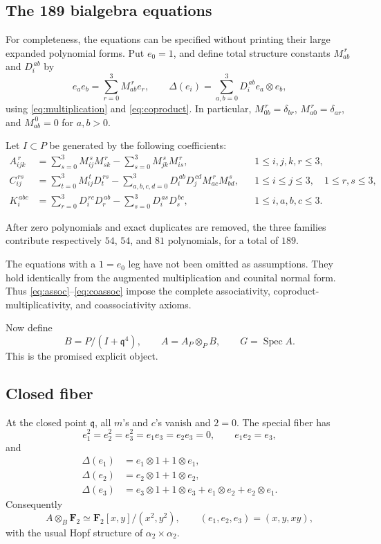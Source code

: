 \documentclass[11pt]{article}
\theoremstyle{remark}
\newcommand{\F}{\mathbf F}
\newcommand{\Spec}{\operatorname{Spec}}
\newcommand{\q}{\mathfrak q}
\begin{document}
\subsection{The 189 bialgebra equations}

For completeness, the equations can be specified without printing their
large expanded polynomial forms.  Put \(e_0=1\), and define total structure
constants \(M_{ab}^{\,r}\) and \(D_i^{\,ab}\) by
\[
 e_a e_b=\sum_{r=0}^3M_{ab}^{\,r}e_r,
 \qquad
 \Delta(e_i)=\sum_{a,b=0}^3D_i^{\,ab}e_a\otimes e_b,
\]
using \eqref{eq:multiplication} and \eqref{eq:coproduct}.  In particular,
\(M_{0b}^{\,r}=\delta_{br}\), \(M_{a0}^{\,r}=\delta_{ar}\), and
\(M_{ab}^{\,0}=0\) for \(a,b>0\).

Let \(I\subset P\) be generated by the following coefficients:
\begin{align}
 A_{ijk}^{\,r}
 &=\sum_{s=0}^3M_{ij}^{\,s}M_{sk}^{\,r}
   -\sum_{s=0}^3M_{jk}^{\,s}M_{is}^{\,r},
 &&1\le i,j,k,r\le3,\label{eq:assoc}\\
 C_{ij}^{\,rs}
 &=\sum_{t=0}^3M_{ij}^{\,t}D_t^{\,rs}
   -\sum_{a,b,c,d=0}^3D_i^{\,ab}D_j^{\,cd}
       M_{ac}^{\,r}M_{bd}^{\,s},
 &&1\le i\le j\le3,\quad1\le r,s\le3,\label{eq:compat}\\
 K_i^{\,abc}
 &=\sum_{r=0}^3D_i^{\,rc}D_r^{\,ab}
   -\sum_{s=0}^3D_i^{\,as}D_s^{\,bc},
 &&1\le i,a,b,c\le3.\label{eq:coassoc}
\end{align}

After zero polynomials and exact duplicates are removed, the three families
contribute respectively \(54\), \(54\), and \(81\) polynomials, for a total
of \(189\).

The equations with a \(1=e_0\) leg have not been omitted as assumptions.
They hold identically from the augmented multiplication and counital normal
form.  Thus \eqref{eq:assoc}--\eqref{eq:coassoc} impose the complete
associativity, coproduct-multiplicativity, and coassociativity axioms.

Now define
\begin{equation}\label{eq:B-definition}
  B=P/(I+\q^4),\qquad A=A_P\otimes_P B,
  \qquad G=\Spec A.
\end{equation}
This is the promised explicit object.

\subsection{Closed fiber}

At the closed point \(\q\), all \(m\)'s and \(c\)'s vanish and \(2=0\).  The
special fiber has
\[
  e_1^2=e_2^2=e_3^2=e_1e_3=e_2e_3=0,
  \qquad e_1e_2=e_3,
\]
and
\[
\begin{aligned}
 \Delta(e_1)&=e_1\otimes1+1\otimes e_1,\\
 \Delta(e_2)&=e_2\otimes1+1\otimes e_2,\\
 \Delta(e_3)&=e_3\otimes1+1\otimes e_3
              +e_1\otimes e_2+e_2\otimes e_1.
\end{aligned}
\]
Consequently
\[
  A\otimes_B\F_2\simeq\F_2[x,y]/(x^2,y^2),
  \qquad(e_1,e_2,e_3)=(x,y,xy),
\]
with the usual Hopf structure of \(\alpha_2\times\alpha_2\).
\end{document}
